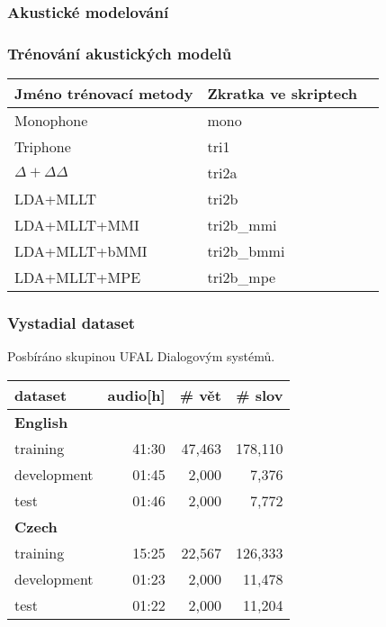 \begin{frame}\frametitle{Akustické modelování} 
    
\end{frame}

\begin{frame}\frametitle{Trénování akustických modelů} 
    \begin{center}
        
        \small{\begin{tabular}{lll}
        \hline
        Jméno trénovací metody & Zkratka ve skriptech \\
        \hline
        Monophone & mono \\
        Triphone  & tri1 \\
        $\Delta + \Delta\Delta$ & tri2a  \\
        LDA+MLLT & tri2b  \\
        LDA+MLLT+MMI & tri2b\_mmi \\
        LDA+MLLT+bMMI & tri2b\_bmmi \\
        LDA+MLLT+MPE & tri2b\_mpe \\
        \hline
        \end{tabular}}
    \end{center}
\end{frame}

\begin{frame}\frametitle{Vystadial dataset} 
    \begin{center}
    Posbíráno skupinou UFAL Dialogovým systémů.\\
    \begin{tabular}{lrrr}
        \hline
        dataset & audio[h] & \# vět & \# slov \\
        \hline
        \textbf{English} & & & \\
                training & 41:30 & 47,463 & 178,110 \\
                development & 01:45 & 2,000 & 7,376 \\
                test & 01:46 & 2,000 & 7,772 \\
        \hline
        \textbf{Czech} & & & \\
                training & 15:25 & 22,567 & 126,333 \\
                development & 01:23 & 2,000 & 11,478 \\
                test & 01:22 & 2,000 & 11,204 \\
        \hline
		\end{tabular}
    \end{center}
\end{frame}

